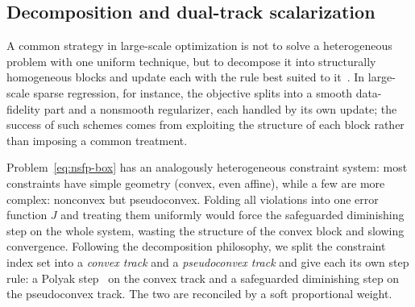 \documentclass[]{interact}
\theoremstyle{plain}
\theoremstyle{definition}
\theoremstyle{remark}
\begin{document}
\subsection{Decomposition and dual-track scalarization}\label{ssec:dual-track}
A common strategy in large-scale optimization is not to solve a
heterogeneous problem with one uniform technique, but to decompose it into
structurally homogeneous blocks and update each with the rule best suited to
it~\citep{boyd2011admm}. In large-scale sparse regression, for instance, the objective
splits into a smooth data-fidelity part and a nonsmooth regularizer, each handled by
its own update; the success of such schemes comes from exploiting the structure of
each block rather than imposing a common treatment.

Problem~\eqref{eq:nsfp-box} has an analogously heterogeneous constraint system: most
constraints have simple geometry (convex, even affine), while a few are more
complex: nonconvex but pseudoconvex. Folding all violations into one error function
$J$ and treating them uniformly would force the safeguarded diminishing step on the
whole system, wasting the structure of the convex block and slowing convergence.
Following the decomposition philosophy, we split the constraint index set into a
\emph{convex track} and a \emph{pseudoconvex track} and give each its own step rule: a
Polyak step~\citep{polyak1969} on the convex track and a safeguarded diminishing step on the pseudoconvex
track. The two are reconciled by a soft proportional weight.
\end{document}
